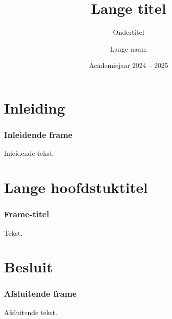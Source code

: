 \documentclass
[kulak,handout] %
{kulakbeamer}
\title[Korte titel]{Lange titel}
\subtitle{Ondertitel}
\author[Korte naam]{Lange naam}
\institute[Kulak]{KU Leuven Kulak}
\date{Academiejaar 2024 -- 2025}
\begin{document}
	
	\begin{titleframe}
		\titlepage
	\end{titleframe}
	
	\begin{outlineframe}[Overzicht]
		\tableofcontents
	\end{outlineframe}
	
	
	\section{Inleiding}
	
	\begin{frame}
		\frametitle{Inleidende frame}
		Inleidende tekst.
	\end{frame}
	
	\section[Korte titel]{Lange hoofdstuktitel}
	
	\begin{frame}
		\frametitle{Frame-titel}
		Tekst.
	\end{frame}
	
	\section{Besluit}
	\begin{frame}
		\frametitle{Afsluitende frame}
		Afsluitende tekst.
	\end{frame}
	
\end{document}
